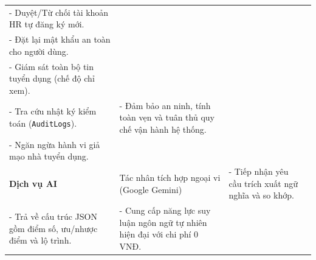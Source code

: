 \begin{table}[htbp]
\begin{tabularx}{\textwidth}{l p{2.8cm} X p{3.2cm}}
- Duyệt/Từ chối tài khoản HR tự đăng ký mới.\\
- Đặt lại mật khẩu an toàn cho người dùng.\\
- Giám sát toàn bộ tin tuyển dụng (chế độ chỉ xem).\\
- Tra cứu nhật ký kiểm toán (\texttt{AuditLogs}). &
- Đảm bảo an ninh, tính toàn vẹn và tuân thủ quy chế vận hành hệ thống.\\
- Ngăn ngừa hành vi giả mạo nhà tuyển dụng.\\
\addlinespace
\textbf{Dịch vụ AI} & Tác nhân tích hợp ngoại vi (Google Gemini) &
- Tiếp nhận yêu cầu trích xuất ngữ nghĩa và so khớp.\\
- Trả về cấu trúc JSON gồm điểm số, ưu/nhược điểm và lộ trình. &
- Cung cấp năng lực suy luận ngôn ngữ tự nhiên hiện đại với chi phí 0 VNĐ.\\
\bottomrule
\end{tabularx}
\end{table}
